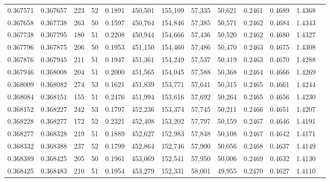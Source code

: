 \begin{tabular}{rrrrrrrrrrrrr}
0.367571 & 0.367657 &   223 &  52 &                                     0.1891 & 450,501 & 155,109 &  57,335 &  50,621 & 0.2461 & 0.4689 & 1.4368 \\
0.367658 & 0.367738 &   263 &  50 &                                     0.1597 & 450,764 & 154,846 &  57,385 &  50,571 & 0.2462 & 0.4684 & 1.4343 \\
0.367738 & 0.367795 &   180 &  51 &                                     0.2208 & 450,944 & 154,666 &  57,436 &  50,520 & 0.2462 & 0.4680 & 1.4327 \\
0.367796 & 0.367875 &   206 &  50 &                                     0.1953 & 451,150 & 154,460 &  57,486 &  50,470 & 0.2463 & 0.4675 & 1.4308 \\
0.367876 & 0.367945 &   211 &  51 &                                     0.1947 & 451,361 & 154,249 &  57,537 &  50,419 & 0.2463 & 0.4670 & 1.4288 \\
0.367946 & 0.368008 &   204 &  51 &                                     0.2000 & 451,565 & 154,045 &  57,588 &  50,368 & 0.2464 & 0.4666 & 1.4269 \\
0.368009 & 0.368082 &   274 &  53 &                                     0.1621 & 451,839 & 153,771 &  57,641 &  50,315 & 0.2465 & 0.4661 & 1.4244 \\
0.368084 & 0.368151 &   155 &  51 &                                     0.2476 & 451,994 & 153,616 &  57,692 &  50,264 & 0.2465 & 0.4656 & 1.4230 \\
0.368152 & 0.368227 &   242 &  53 &                                     0.1797 & 452,236 & 153,374 &  57,745 &  50,211 & 0.2466 & 0.4651 & 1.4207 \\
0.368228 & 0.368277 &   172 &  52 &                                     0.2321 & 452,408 & 153,202 &  57,797 &  50,159 & 0.2467 & 0.4646 & 1.4191 \\
0.368277 & 0.368328 &   219 &  51 &                                     0.1889 & 452,627 & 152,983 &  57,848 &  50,108 & 0.2467 & 0.4642 & 1.4171 \\
0.368332 & 0.368388 &   237 &  52 &                                     0.1799 & 452,864 & 152,746 &  57,900 &  50,056 & 0.2468 & 0.4637 & 1.4149 \\
0.368389 & 0.368425 &   205 &  50 &                                     0.1961 & 453,069 & 152,541 &  57,950 &  50,006 & 0.2469 & 0.4632 & 1.4130 \\
0.368425 & 0.368483 &   210 &  51 &                                     0.1954 & 453,279 & 152,331 &  58,001 &  49,955 & 0.2470 & 0.4627 & 1.4110 \\

\end{tabular}
